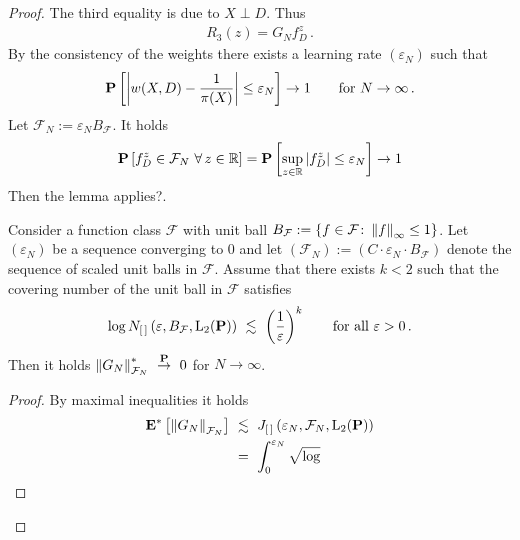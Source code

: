 \begin{proof}
  The third equality is due to $X\perp D$.
  Thus
  \begin{gather}
    R_3(z)
    =
    G_N
    f_D^z
    \,.
  \end{gather}
  By the consistency of the weights there exists a learning rate $(\varepsilon_N)$ such that
  \begin{gather}
    \P
    \left[ 
      \left| 
      w(X,D)
      -
      \frac{1}{\pi(X)}
      \right|
      \le
      \varepsilon_N
    \right]
    \to 1 
    \qquad
    \text{for}\ 
    N\to \infty
    \,.
  \end{gather}
  Let
  $
  \mathcal{F}_N
  :=
  \varepsilon_N B_{\mathcal{F}}$.
  It holds
  \begin{gather}
    \mathbf{P}
    \left[ 
    f_D^z
    \in
  \mathcal{F}_N
  \ \forall\,z\in\mathbb{R}
    \right]
    =
    \mathbf{P}
    \left[ 
      \sup_{z\in\mathbb{R}}
      \left| 
    f_D^z
      \right|
      \le
      \varepsilon_N
    \right]
    \to 1
  \end{gather}
  Then the lemma applies?.
\begin{lemma}
  \label{lemma_max_ineq}
  Consider a function class $\mathcal{F}$ with unit ball
  $
  B_{\mathcal{F}}
  :=
  \left\{ 
    f\in \mathcal{F}
    \colon
    \left\lVert f\right\rVert_\infty
    \le
    1
  \right\}
  $.
  Let $(\varepsilon_N)$ be a sequence converging to 0
  and let 
  $
  \left( 
    \mathcal{F}_N
  \right)
    :=
    \left( 
      C\cdot
    \varepsilon_N\cdot B_\mathcal{F}
    \right)
  $
  denote the sequence of scaled unit balls in $\mathcal{F}$.
  Assume that 
  there exists
  $k<2$ such that 
  the covering number of the unit ball in $\mathcal{F}$
  satisfies
  \begin{gather}
        \log 
      N_{[\,]}
\left( \varepsilon, B_\mathcal{F},\mathrm{L}_2(\P) \right)
\ 
\lesssim
\ 
\left( \frac{1}{\varepsilon} \right)^k
\qquad
\text{for all}\ 
\varepsilon>0
\,.
  \end{gather}
  Then it holds
  $
      \norm{G_N}^*_{\mathcal{F}_N}
    \ 
    \overset{\P}
    {\to}
    \ 
    0
  $
  for $N\to \infty$. 
\end{lemma}
\begin{proof}
  By maximal inequalities it holds
  \begin{align*}
    \E^*
    \left[ 
      \norm{G_N}_{\mathcal{F}_N}
    \right]
    &
      \ 
      \lesssim
      \ 
      J_{[\,]}\left( \varepsilon_N, \mathcal{F}_N,\mathrm{L}_2(\P) \right)
      \\
    &
      \ 
      =
      \ 
      \int_0^{\varepsilon_N}
      \sqrt{
        \log 
}
\end{align*}
\end{proof}
\end{proof}
